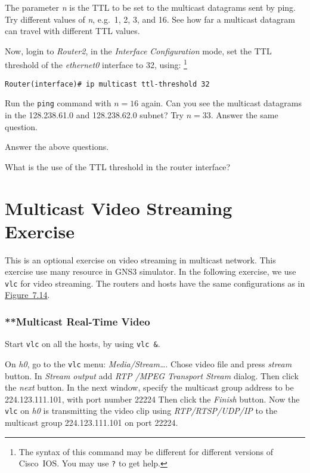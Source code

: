\documentclass{../UTNetLab}
\begin{document}
    The parameter \textit{n} is the TTL to be set to the multicast datagrams sent by ping.
    Try different values of \textit{n}, e.g.\ 1, 2, 3, and 16.
    See how far a multicast datagram can travel with different TTL values.

    Now, login to \textit{Router2}, in the \textit{Interface Configuration} mode, set the TTL threshold of the \textit{ethernet0} interface to 32, using: 
    \footnote{The syntax of this command may be different for different versions of Cisco~IOS.
    You may use \lstinline[language={cisco}]{?} to get help.}
    \begin{lstlisting}[language={cisco}]    
Router(interface)# ip multicast ttl-threshold 32
    \end{lstlisting}

    Run the \lstinline{ping} command with $n = 16$ again.
    Can you see the multicast datagrams in the 128.238.61.0 and 128.238.62.0 subnet?
    Try $n = 33$.
    Answer the same question.
    
    \begin{report}
        \item Answer the above questions.
        
        \item What is the use of the TTL threshold in the router interface?
    \end{report}

\part{Multicast Video Streaming Exercise}
    This is an optional exercise on video streaming in multicast network.
    This exercise use many resource in GNS3 simulator.
    In the following exercise, we use \lstinline{vlc} for video streaming.
    The routers and hosts have the same configurations as in \hyperref[fig:7.14]{Figure~7.14}.

\section{**Multicast Real-Time Video}
    Start \lstinline{vlc} on all the hosts, by using \lstinline{vlc &}.

    On \textit{h0}, go to the \lstinline{vlc} menu: \textit{Media/Stream\ldots }.
    Chose video file  and press \textit{stream} button.
    In \textit{Stream output} add \textit{RTP /MPEG Transport Stream} dialog.
    Then click the \textit{next} button.
    In the next window, specify the multicast group address to be {224.123.111.101}, with port number {22224} %
    Then click the \textit{Finish} button.
    Now the \lstinline{vlc} on \textit{h0} is transmitting the video clip using \textit{RTP/RTSP/UDP/IP} to the multicast group {224.123.111.101} on port {22224}.
\end{document}
